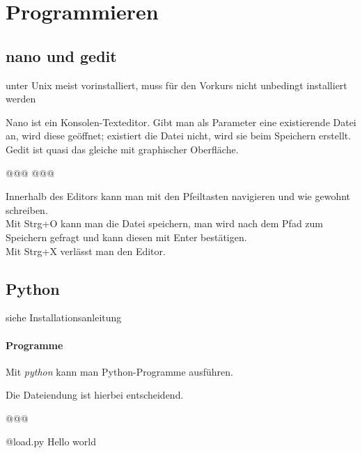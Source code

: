 \section{Programmieren}
\subsection{nano und gedit}
\begin{defBox}
     unter Unix meist vorinstalliert, muss für den Vorkurs nicht unbedingt installiert werden
\end{defBox}
Nano ist ein Konsolen-Texteditor. Gibt man als Parameter eine existierende Datei an, wird diese geöffnet; existiert die Datei nicht, wird sie beim Speichern erstellt. Gedit ist quasi das gleiche mit graphischer Oberfläche.
\begin{commandshell}
@\shellprefix@nano @\textit{}@
@\shellprefix@gedit @\textit{}@
\end{commandshell}
Innerhalb des Editors kann man mit den Pfeiltasten navigieren und wie gewohnt schreiben.\\
Mit Strg+O kann man die Datei speichern, man wird nach dem Pfad zum Speichern gefragt und kann diesen mit Enter bestätigen.\\
Mit Strg+X verlässt man den Editor.

\subsection{Python}
\begin{defBox}
     siehe Installationsanleitung
\end{defBox}
\paragraph*{Programme}\mbox{}

Mit \textit{python} kann man Python-Programme ausführen.
\begin{defBox}
     Die Dateiendung ist hierbei entscheidend.
\end{defBox}

\begin{commandshell}
    @\shellprefix@python @\textit{}@
\end{commandshell}

\begin{commandshell}
    @\shellprefix@python load.py
    Hello world
\end{commandshell}

